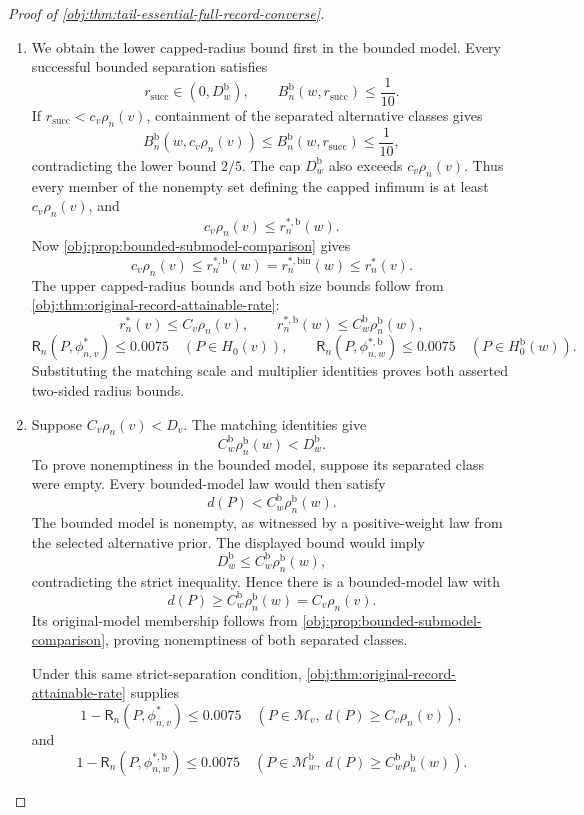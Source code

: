 \begin{proof}[Proof of \cref{obj:thm:tail-essential-full-record-converse}]
\begin{enumerate}
\item
We obtain the lower capped-radius bound first in the bounded model.
Every successful bounded separation satisfies
\[
r_{\mathrm{succ}}\in(0,D_w^{\mathrm b}),
\qquad
B_n^{\mathrm b}(w,r_{\mathrm{succ}})\le\frac1{10}.
\]
If \(r_{\mathrm{succ}}<c_v\rho_n(v)\), containment of the separated
alternative classes gives
\[
B_n^{\mathrm b}(w,c_v\rho_n(v))
\le B_n^{\mathrm b}(w,r_{\mathrm{succ}})
\le\frac1{10},
\]
contradicting the lower bound \(2/5\). The cap
\(D_w^{\mathrm b}\) also exceeds \(c_v\rho_n(v)\). Thus every member of
the nonempty set defining the capped infimum is at least
\(c_v\rho_n(v)\), and
\[
c_v\rho_n(v)\le r_n^{*,\mathrm b}(w).
\]
Now \cref{obj:prop:bounded-submodel-comparison} gives
\[
c_v\rho_n(v)
\le r_n^{*,\mathrm b}(w)
=r_n^{*,\mathrm{bin}}(w)
\le r_n^*(v).
\]
The upper capped-radius bounds and both size bounds follow from
\cref{obj:thm:original-record-attainable-rate}:
\[
r_n^*(v)\le C_v\rho_n(v),\qquad
r_n^{*,\mathrm b}(w)\le C_w^{\mathrm b}\rho_n^{\mathrm b}(w),
\]
\[
\mathsf R_n(P,\phi^*_{n,v})\le0.0075
\quad(P\in H_0(v)),\qquad
\mathsf R_n(P,\phi^{*,\mathrm b}_{n,w})\le0.0075
\quad(P\in H_0^{\mathrm b}(w)).
\]
Substituting the matching scale and multiplier identities proves both
asserted two-sided radius bounds.

\item
Suppose \(C_v\rho_n(v)<D_v\). The matching identities give
\[
C_w^{\mathrm b}\rho_n^{\mathrm b}(w)<D_w^{\mathrm b}.
\]
To prove nonemptiness in the bounded model, suppose its separated class
were empty. Every bounded-model law would then satisfy
\[
d(P)<C_w^{\mathrm b}\rho_n^{\mathrm b}(w).
\]
The bounded model is nonempty, as witnessed by a positive-weight law
from the selected alternative prior. The displayed bound would imply
\[
D_w^{\mathrm b}
\le C_w^{\mathrm b}\rho_n^{\mathrm b}(w),
\]
contradicting the strict inequality. Hence there is a bounded-model law
with
\[
d(P)\ge C_w^{\mathrm b}\rho_n^{\mathrm b}(w)=C_v\rho_n(v).
\]
Its original-model membership follows from
\cref{obj:prop:bounded-submodel-comparison}, proving nonemptiness of both
separated classes.

Under this same strict-separation condition,
\cref{obj:thm:original-record-attainable-rate} supplies
\[
1-\mathsf R_n(P,\phi^*_{n,v})\le0.0075
\quad(P\in\mathcal M_v,\ d(P)\ge C_v\rho_n(v)),
\]
and
\[
1-\mathsf R_n(P,\phi^{*,\mathrm b}_{n,w})\le0.0075
\quad
(P\in\mathcal M_w^{\mathrm b},\
d(P)\ge C_w^{\mathrm b}\rho_n^{\mathrm b}(w)).
\]


\end{enumerate}
\end{proof}
